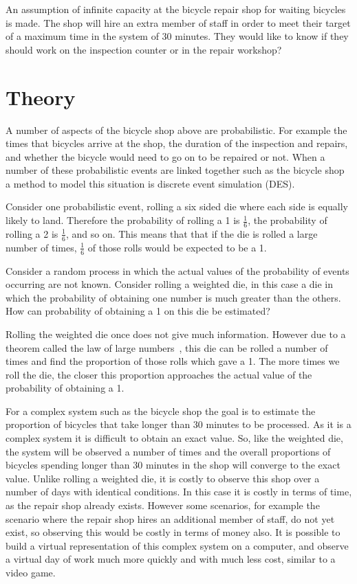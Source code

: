 An assumption of infinite capacity at the bicycle repair shop
for waiting bicycles is made.
The shop will hire an extra member of staff in order to meet their target of a
maximum time in the system of 30 minutes. They would like to know if they
should work on the inspection counter or in the repair workshop?

\section{Theory}\label{sec:discrete_event_simulation_theory}

A number of aspects of the bicycle shop above are probabilistic.
For example the times that bicycles arrive at the shop, the duration of the
inspection and repairs, and whether the bicycle would need to go on to be
repaired or not. When a number of these probabilistic events are linked together
such as the bicycle shop a method to model this situation is
discrete event simulation (DES).

Consider one probabilistic event, rolling a six sided die where each side is
equally likely to land. Therefore the probability of rolling a 1 is
\(\frac{1}{6}\), the probability of rolling a 2 is \(\frac{1}{6}\), and so on.
This means that that if the die is rolled a large number of times,
\(\frac{1}{6}\) of those rolls would be expected to be a 1.

Consider a random process in which the actual values of the probability
of events occurring are not known. Consider rolling a weighted die, in this case
a die in which the probability of obtaining one number is much greater than the
others. How can probability of obtaining a 1 on this die be estimated?

Rolling the weighted die once does not give much information.
However due to a theorem called the law of large
numbers~\cite{stewart2009probability}, this die can
be rolled a number of times and find the proportion of those rolls which gave a
1. The more times we roll the die, the closer this proportion approaches the
actual value of the probability of obtaining a 1.

For a complex system such as the bicycle shop the goal is to estimate the
proportion of bicycles that take longer than 30 minutes to be processed. As it
is a complex system it is difficult to obtain an exact value. So,
like the weighted die, the system will be observed a number of times and
the overall proportions
of bicycles spending longer than 30 minutes in the shop will converge to
the exact value.
Unlike rolling a weighted die, it is costly to observe this shop over a
number of days with identical conditions. In this case it is costly in terms of
time, as the repair shop already exists. However some scenarios, for example the
scenario where the repair shop hires an additional member of staff, do not yet
exist, so observing this would be costly in terms of money also.
It is possible to build a virtual representation of this complex system on a
computer, and observe a virtual day of work much more quickly and with much less
cost, similar to a video game.

